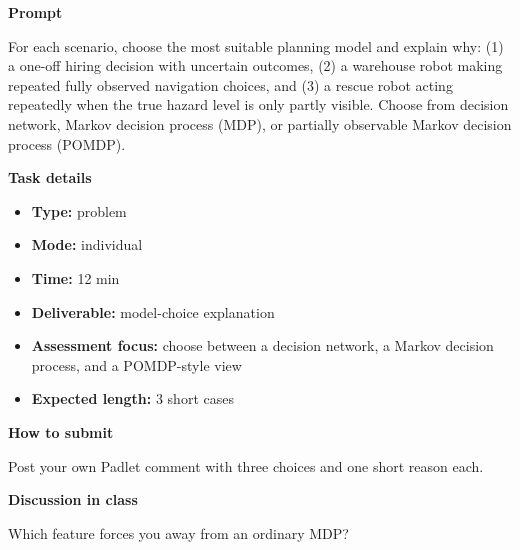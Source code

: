 \documentclass[11pt]{article}
\begin{document}
\begin{tcolorbox}[colback=white,colframe=MidnightBlue,title={Q3 Structured Problem},fonttitle=\bfseries,breakable]
\begin{center}
\end{center}

{\large\bfseries\color{MidnightBlue} Prompt}\par\medskip
For each scenario, choose the most suitable planning model and explain why: (1) a one-off hiring decision with uncertain outcomes, (2) a warehouse robot making repeated fully observed navigation choices, and (3) a rescue robot acting repeatedly when the true hazard level is only partly visible. Choose from decision network, Markov decision process (MDP), or partially observable Markov decision process (POMDP).

{\large\bfseries\color{MidnightBlue} Task details}\par\medskip
\begin{itemize}\item \textbf{Type:} problem
\item \textbf{Mode:} individual
\item \textbf{Time:} 12 min
\item \textbf{Deliverable:} model-choice explanation
\item \textbf{Assessment focus:} choose between a decision network, a Markov decision process, and a POMDP-style view
\item \textbf{Expected length:} 3 short cases\end{itemize}

{\large\bfseries\color{MidnightBlue} How to submit}\par\medskip
Post your own Padlet comment with three choices and one short reason each.

{\large\bfseries\color{MidnightBlue} Discussion in class}\par\medskip
Which feature forces you away from an ordinary MDP?


\end{tcolorbox}
\end{document}

